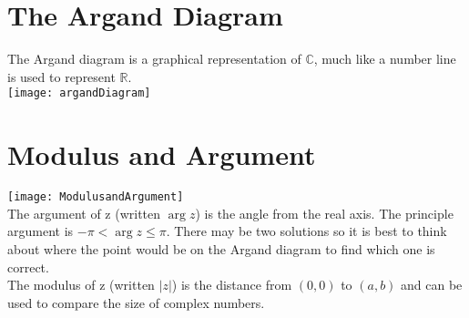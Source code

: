\documentclass[class=article, crop=false]{standalone}
\begin{document}
\section*{The Argand Diagram}
The Argand diagram is a graphical representation of $\mathbb{C}$, much like a number line is used to represent $\mathbb{R}$. \\
\texttt{[image: argandDiagram]} \\

\section*{Modulus and Argument}
\texttt{[image: ModulusandArgument]} \\
The argument of z (written $\arg z$) is the angle from the real axis. The principle argument is $-\pi < \arg z \leqslant \pi$. There may be two solutions so it is best to think about where the point would be on the Argand diagram to find which one is correct. \\

The modulus of z (written $|z|$) is the distance from $(0,0)$ to $(a,b)$ and can be used to compare the size of complex numbers. \\
\end{document}
